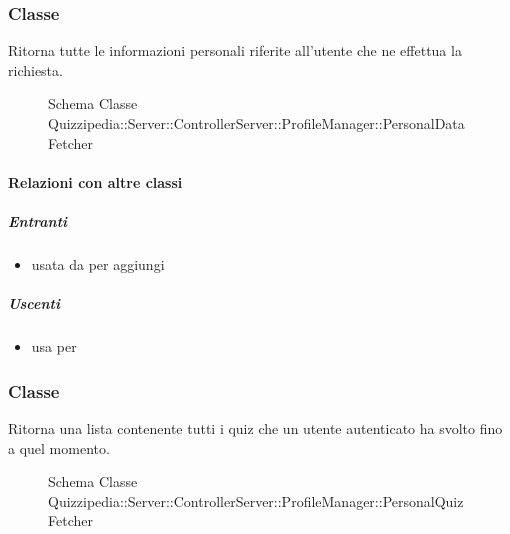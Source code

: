 \subsubsection{Classe }
Ritorna tutte le informazioni personali riferite all'utente che ne effettua la richiesta.
\begin{figure}[H]
\centering
\noindent{}
\caption[Schema Classe PersonalDataFetcher]{Schema Classe Quizzipedia::Server::ControllerServer::ProfileManager::PersonalDataFetcher}
\end{figure}
\paragraph{Relazioni con altre classi}
\subparagraph{Entranti}
\begin{itemize}
\item usata da  per aggiungi
\end{itemize}
\subparagraph{Uscenti}
\begin{itemize}
\item usa  per 
\end{itemize}
\subsubsection{Classe }
Ritorna una lista contenente tutti i quiz che un utente autenticato ha svolto fino a quel momento.
\begin{figure}[H]
\centering
\noindent{}
\caption[Schema Classe PersonalQuizFetcher]{Schema Classe Quizzipedia::Server::ControllerServer::ProfileManager::PersonalQuizFetcher}
\end{figure}
